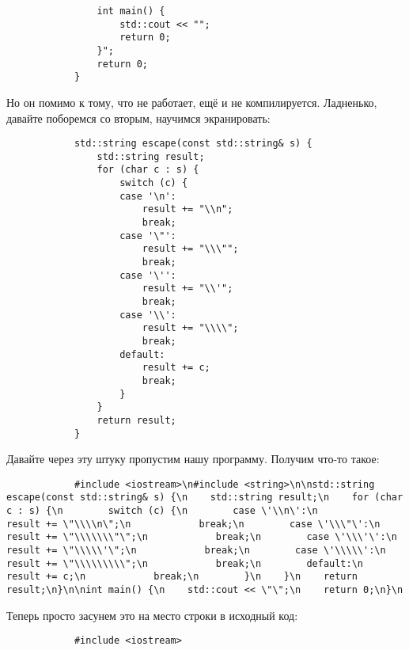 \documentclass{article}
\begin{document}
\begin{remark}
\begin{verbatim}
                int main() {
                    std::cout << "";
                    return 0;
                }";
                return 0;
            }
        \end{verbatim}
        Но он помимо к тому, что не работает, ещё и не компилируется. Ладненько, давайте поборемся со вторым, научимся экранировать:
        \begin{verbatim}
            std::string escape(const std::string& s) {
                std::string result;
                for (char c : s) {
                    switch (c) {
                    case '\n':
                        result += "\\n";
                        break;
                    case '\"':
                        result += "\\\"";
                        break;
                    case '\'':
                        result += "\\'";
                        break;
                    case '\\':
                        result += "\\\\";
                        break;
                    default:
                        result += c;
                        break;
                    }
                }
                return result;
            }
        \end{verbatim}
        Давайте через эту штуку пропустим нашу программу. Получим что-то такое:
        \begin{verbatim}
            #include <iostream>\n#include <string>\n\nstd::string escape(const std::string& s) {\n    std::string result;\n    for (char c : s) {\n        switch (c) {\n        case \'\\n\':\n            result += \"\\\\n\";\n            break;\n        case \'\\\"\':\n            result += \"\\\\\\\"\";\n            break;\n        case \'\\\'\':\n            result += \"\\\\\'\";\n            break;\n        case \'\\\\\':\n            result += \"\\\\\\\\\";\n            break;\n        default:\n            result += c;\n            break;\n        }\n    }\n    return result;\n}\n\nint main() {\n    std::cout << \"\";\n    return 0;\n}\n
        \end{verbatim}
        Теперь просто засунем это на место строки в исходный код:
        \begin{verbatim}
            #include <iostream>


\end{verbatim}
\end{remark}
\end{document}
